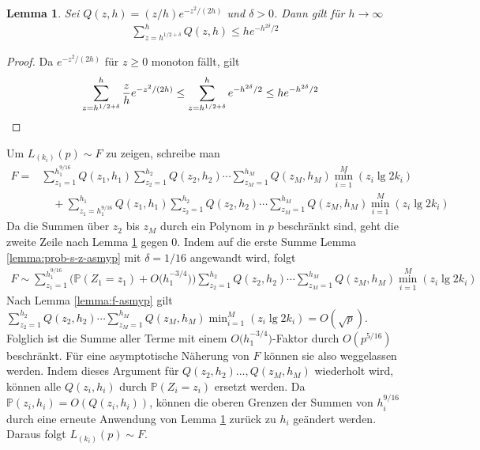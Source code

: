 \documentclass[a4paper, 11pt, ngerman]{article}
\renewcommand{\P}{\mathbb{P}}
\theoremstyle{definition}
\theoremstyle{plain}
\newtheorem{lemma}{Lemma}
\theoremstyle{remark}
\begin{document}
\begin{lemma}
    Sei $Q(z, h) = (z/h)e^{-z^2/(2h)}$ und $\delta > 0$. Dann gilt für $h \to \infty$
    \begin{align*}
        \sum_{z = h^{1/2 + \delta}}^h Q(z, h) \le he^{-h^{2\delta}/2}
    \end{align*}

    \label{lemma:q-large-z-asymp}
\end{lemma}

\begin{proof}
    Da $e^{-z^2/(2h)}$ für $z \ge 0$ monoton fällt, gilt
    \begin{align*}
         & \sum_{z = h^{1/2 + \delta}}^h \frac z h e^{-z^2/(2h)}
        \le \sum_{z = h^{1/2 + \delta}}^h e^{-h^{2\delta}/2}
        \le he^{-h^{2\delta}/2} \qedhere
    \end{align*}
\end{proof}

Um $L_{(k_i)}(p) \sim F$ zu zeigen, schreibe man
\begin{align*}
    F = & \sum_{z_1 = 1}^{h_1^{9/16}} Q(z_1, h_1)
    \sum_{z_2 = 1}^{h_2} Q(z_2, h_2)    \cdots
    \sum_{z_M = 1}^{h_M} Q(z_M, h_M)
    \min_{i = 1}^M (z_i \lg 2k_i)                 \\
        & \quad +
    \sum_{z_1 = h_1^{9/16}}^{h_1} Q(z_1, h_1)
    \sum_{z_2 = 1}^{h_2} Q(z_2, h_2)    \cdots
    \sum_{z_M = 1}^{h_M} Q(z_M, h_M)
    \min_{i = 1}^M (z_i \lg 2k_i)
\end{align*}
Da die Summen über $z_2$ bis $z_M$ durch ein Polynom in $p$ beschränkt sind, geht die zweite Zeile nach Lemma \ref{lemma:q-large-z-asymp} gegen 0. Indem auf die erste Summe Lemma \ref{lemma:prob-s-z-asmyp} mit $\delta = 1/16$ angewandt wird, folgt
\begin{align*}
    F \sim \sum_{z_1 = 1}^{h_1^{9/16}}
    \Big ( \P(Z_1 = z_1) + O \Big ( h_1^{-3/4} \Big ) \Big )
    \sum_{z_2 = 1}^{h_2} Q(z_2, h_2)    \cdots
    \sum_{z_M = 1}^{h_M} Q(z_M, h_M)
    \min_{i = 1}^M (z_i \lg 2k_i)
\end{align*}
Nach Lemma \ref{lemma:f-asmyp} gilt $\sum_{z_2 = 1}^{h_2} Q(z_2, h_2) \cdots \sum_{z_M = 1}^{h_M} Q(z_M, h_M) \min_{i = 1}^M (z_i \lg 2k_i) = O(\sqrt p)$. Folglich ist die Summe aller Terme mit einem $O \big (h_1^{-3/4} \big )$-Faktor durch $O(p^{5/16})$ beschränkt. Für eine asymptotische Näherung von $F$ können sie also weggelassen werden. Indem dieses Argument für $Q(z_2, h_2) \dots, Q(z_M, h_M)$ wiederholt wird, können alle $Q(z_i, h_i)$ durch $\P(Z_i = z_i)$ ersetzt werden. Da $\P(z_i, h_i) = O(Q(z_i, h_i))$, können die oberen Grenzen der Summen von $h_i^{9/16}$ durch eine erneute Anwendung von Lemma \ref{lemma:q-large-z-asymp} zurück zu $h_i$ geändert werden. Daraus folgt $L_{(k_i)}(p) \sim F$.
\end{document}
